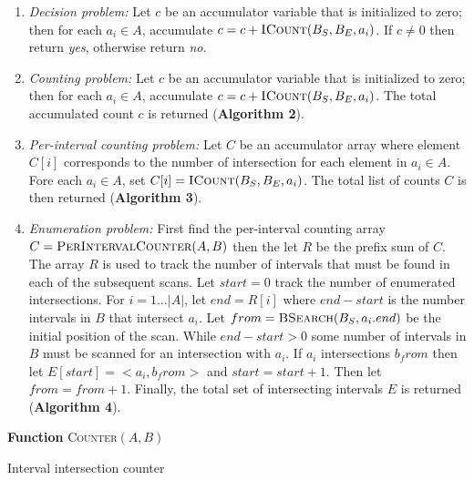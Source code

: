 \documentclass{bioinfo}
\begin{document}
	\begin{enumerate}

		\item
		{\em Decision problem:} Let $c$ be an accumulator variable that is
		initialized to zero; then for each $a_i \in A$, accumulate $c = c +
		\textsc{ICount}(B_S,B_E,a_i)$.  If $c\ne0$ then return {\em yes}, otherwise
		return {\em no}.

		\item
		{\em Counting problem:}  Let $c$ be an accumulator variable that is
		initialized to zero; then for each $a_i \in A$, accumulate $c = c +
		\textsc{ICount}(B_S,B_E,a_i)$.  The total accumulated count $c$ is 
		returned (\textbf{Algorithm 2}).

		\item
		{\em Per-interval counting problem:} Let $C$ be an accumulator
		array where element $C[i]$ corresponds to the number of
		intersection for each element in $a_i\in A$.  Fore each $a_i \in A$,
		set $C[i]=\textsc{ICount}(B_S,B_E,a_i)$.  The total list of counts $C$ is then
		returned (\textbf{Algorithm 3}).

		\item
		{\em Enumeration problem:}
		First find the per-interval counting array $C=\textsc{PerIntervalCounter}(A,B)$
		then the let $R$ be the prefix sum of $C$. The array $R$ is used to track the
		number of intervals that must be found in each of the subsequent scans.  Let
		$start = 0$ track the number of enumerated intersections.
		For $i=1\dots|A|$, let $end = R[i]$ where $end - start$ is the number intervals
		in $B$ that intersect $a_i$.  Let $from=\textsc{BSearch}(B_S, a_i.end)$ be
		the initial position of the scan.  While $end - start > 0$ some number of
		intervals in $B$ must be scanned for an intersection with $a_i$.  If $a_i$
		intersections $b_from$ then let $E[start] = <a_i, b_from>$ and 
		$start=start+1$.  Then let $from = from +1$.  Finally, the total set of
		intersecting intervals $E$ is returned (\textbf{Algorithm 4}).
	\end{enumerate}
	
	\begin{algorithm}[h]
		\DontPrintSemicolon
		\footnotesize
		\BlankLine
		\textbf{Function} \textsc{Counter}$(A,B)$
		\caption{Interval intersection counter}
	\end{algorithm}
\end{document}
